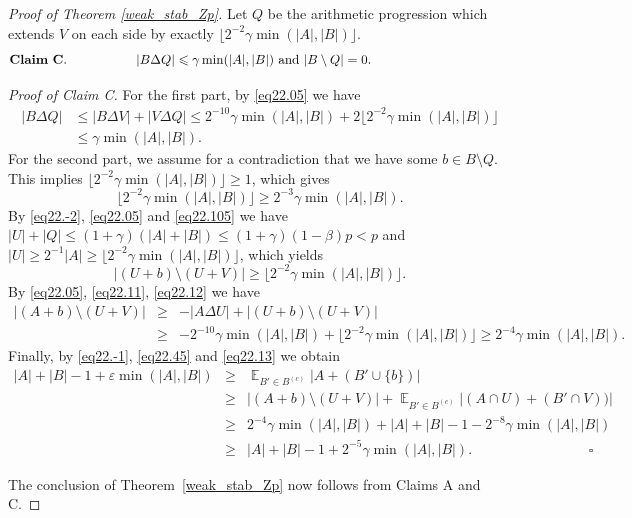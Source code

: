 \documentclass[12pt,reqno]{amsart}
\DeclareMathOperator*{\E}{\mathbb{E}}
\theoremstyle{definition}
\renewcommand\leq{\leqslant}
\renewcommand\geq{\geqslant}
\renewcommand\le{\leqslant}
\begin{document}
\begin{proof}[Proof of Theorem \ref{weak_stab_Zp}]
\vspace{5pt}
Let $Q$ be the arithmetic progression which extends $V$ on each side by exactly $\lfloor 2^{-2}\gamma \min(|A|,|B|) \rfloor$.\\


\vspace{5pt}
\[
{\bf Claim\ C.} \ \ \ \ \ \ \ \ \ \ \ \ \ \ \ \   |B \Delta Q| \leq \gamma \min(|A|,|B|) \text{ and } |B\setminus Q|=0. \ \ \ \ \ \ \ \ \ \ \ \ \ \ \ \ \ \ \ \ \ \ \ \ \ \ \ \ \ \ \ \
\]


\noindent
{\em Proof of Claim C.}
For the first part, by \eqref{eq22.05} we have
\begin{equation}\label{eq22.105}
\begin{split}
        |B\Delta Q|&\leq |B\Delta V|+|V\Delta Q|
        \leq 2^{-10}\gamma \min(|A|,|B|)+ 2\lfloor 2^{-2}\gamma \min(|A|,|B|)\rfloor\\
        &\leq \gamma \min(|A|,|B|).
\end{split}
\end{equation}
For the second part, we assume for a contradiction that we have some
$b\in B\setminus Q$.
This implies $\lfloor2^{-2}\gamma \min(|A|,|B|)\rfloor\geq 1$,
which gives
\begin{equation}\label{eq22.11}
    \lfloor 2^{-2}\gamma \min(|A|,|B|) \rfloor \geq  2^{-3}\gamma \min(|A|,|B|).
\end{equation}
By \eqref{eq22.-2}, \eqref{eq22.05} and \eqref{eq22.105} we have
$|U|+|Q| \leq (1+\gamma)(|A|+|B|)\le (1+\gamma)(1-\beta)p <p$ and
$|U| \geq 2^{-1}|A| \geq \lfloor 2^{-2} \gamma \min(|A|,|B|) \rfloor$, which yields
\begin{equation}\label{eq22.12}
    |(U+b)\setminus (U+V)|\geq \lfloor 2^{-2}\gamma \min(|A|,|B|) \rfloor.
\end{equation}
By \eqref{eq22.05}, \eqref{eq22.11}, \eqref{eq22.12} we have
\begin{eqnarray}\label{eq22.13}
        |(A+b) \setminus (U+V)|&\geq& -|A\Delta U|+|(U+b)\setminus (U+V)|\\
        &\geq& -2^{-10}\gamma \min(|A|,|B|)+ \lfloor 2^{-2}\gamma \min(|A|,|B|) \rfloor
        \geq 2^{-4}\gamma \min(|A|,|B|).
\end{eqnarray}
Finally, by \eqref{eq22.-1}, \eqref{eq22.45} and \eqref{eq22.13} we obtain
\begin{eqnarray*}
        |A|+|B|-1 + \varepsilon \min(|A|,|B|) &\geq& \E_{B'\in B^{(c)}}\bigg|A+(B'\cup \{b\})\bigg| \\
        &\geq& \bigg|(A+b)\setminus (U+V)\bigg|+\E_{B'\in B^{(c)}}\bigg|(A\cap U)+(B'\cap V))\bigg|\\
        &\geq& 2^{-4}\gamma \min(|A|,|B|)+ |A|+|B|-1-2^{-8}\gamma\min(|A|,|B|)\\
        &\geq& |A|+|B|-1+2^{-5}\gamma \min(|A|,|B|). \hspace{100pt}{\square}
\end{eqnarray*}

\vspace{7pt}
\noindent
The conclusion of Theorem~\ref{weak_stab_Zp} now follows from Claims A and C.
\end{proof}
\end{document}
